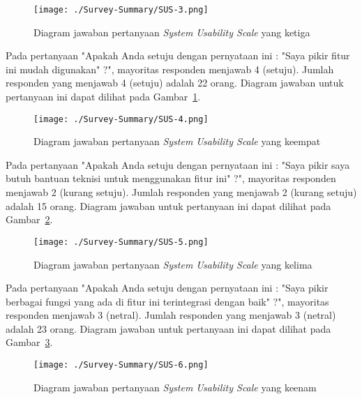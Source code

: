 \begin{figure}[H]
	\centering  
	\texttt{[image: ./Survey-Summary/SUS-3.png]}
	\caption[Diagram jawaban pertanyaan \textit{System Usability Scale} yang ketiga]{Diagram jawaban pertanyaan \textit{System Usability Scale} yang ketiga} 
	\label{fig:summary-SUS-3} 
\end{figure}

Pada pertanyaan "Apakah Anda setuju dengan pernyataan ini : "Saya pikir fitur ini mudah digunakan" ?", mayoritas responden menjawab 4 (setuju). Jumlah responden yang menjawab 4 (setuju) adalah 22 orang. Diagram jawaban untuk pertanyaan ini dapat dilihat pada Gambar~\ref{fig:summary-SUS-3}.

\begin{figure}[H]
	\centering  
	\texttt{[image: ./Survey-Summary/SUS-4.png]}
	\caption[Diagram jawaban pertanyaan \textit{System Usability Scale} yang keempat]{Diagram jawaban pertanyaan \textit{System Usability Scale} yang keempat} 
	\label{fig:summary-SUS-4} 
\end{figure}

Pada pertanyaan "Apakah Anda setuju dengan pernyataan ini : "Saya pikir saya butuh bantuan teknisi untuk menggunakan fitur ini" ?", mayoritas responden menjawab 2 (kurang setuju). Jumlah responden yang menjawab 2 (kurang setuju) adalah 15 orang. Diagram jawaban untuk pertanyaan ini dapat dilihat pada Gambar~\ref{fig:summary-SUS-4}.

\begin{figure}[H]
	\centering  
	\texttt{[image: ./Survey-Summary/SUS-5.png]}
	\caption[Diagram jawaban pertanyaan \textit{System Usability Scale} yang kelima]{Diagram jawaban pertanyaan \textit{System Usability Scale} yang kelima} 
	\label{fig:summary-SUS-5} 
\end{figure}

Pada pertanyaan "Apakah Anda setuju dengan pernyataan ini : "Saya pikir berbagai fungsi yang ada di fitur ini terintegrasi dengan baik" ?", mayoritas responden menjawab 3 (netral). Jumlah responden yang menjawab 3 (netral) adalah 23 orang. Diagram jawaban untuk pertanyaan ini dapat dilihat pada Gambar~\ref{fig:summary-SUS-5}.

\begin{figure}[H]
	\centering  
	\texttt{[image: ./Survey-Summary/SUS-6.png]}
	\caption[Diagram jawaban pertanyaan \textit{System Usability Scale} yang keenam]{Diagram jawaban pertanyaan \textit{System Usability Scale} yang keenam} 
	\label{fig:summary-SUS-6} 
\end{figure}

